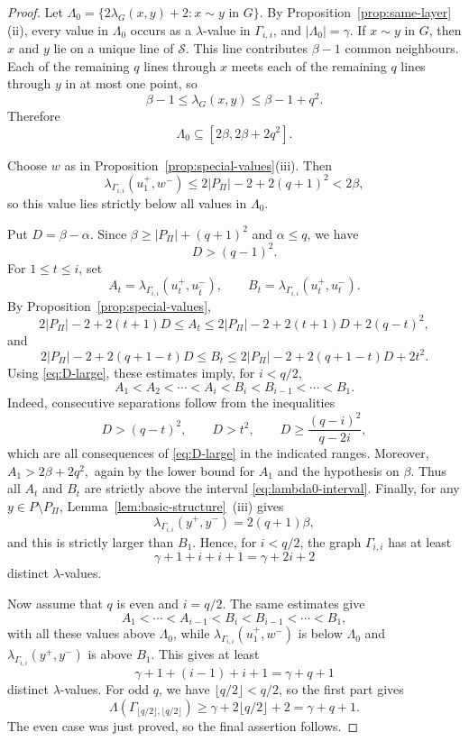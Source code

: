 \documentclass[10pt,a4paper]{amsart}
\begin{document}
\begin{proof}
Let
$\Lambda_0=
\{2\lambda_G(x,y)+2:x\sim y\text{ in }G\}.$
By Proposition~\ref{prop:same-layer}(ii), every value in $\Lambda_0$ occurs as a $\lambda$-value in $\Gamma_{i,i}$, and $|\Lambda_0|=\gamma$.
If $x\sim y$ in $G$, then $x$ and $y$ lie on a unique line of $\mathcal S$.
This line contributes $\beta-1$ common neighbours.
Each of the remaining $q$ lines through $x$ meets each of the remaining $q$ lines through $y$ in at most one point, so
\[
\beta-1\le \lambda_G(x,y)\le \beta-1+q^2.
\]
Therefore
\begin{equation}\label{eq:lambda0-interval}
\Lambda_0\subseteq [2\beta,2\beta+2q^2].
\end{equation}

Choose $w$ as in Proposition~\ref{prop:special-values}(iii).
Then
\[
\lambda_{\Gamma_{i,i}}(u_1^+,w^-)
\le 2|P_\Pi|-2+2(q+1)^2
<2\beta,
\]
so this value lies strictly below all values in $\Lambda_0$.

Put
$D=\beta-\alpha.$
Since $\beta\ge |P_\Pi|+(q+1)^2$ and $\alpha\le q$, we have
\begin{equation}\label{eq:D-large}
D>(q-1)^2.
\end{equation}
For $1\le t\le i$, set
\[
A_t=\lambda_{\Gamma_{i,i}}(u_t^+,u_{\widetilde t}^-),
\qquad
B_t=\lambda_{\Gamma_{i,i}}(u_t^+,u_t^-).
\]
By Proposition~\ref{prop:special-values},
\[
2|P_\Pi|-2+2(t+1)D
\le A_t
\le
2|P_\Pi|-2+2(t+1)D+2(q-t)^2,
\]
and
\[
2|P_\Pi|-2+2(q+1-t)D
\le B_t
\le
2|P_\Pi|-2+2(q+1-t)D+2t^2.
\]
Using \eqref{eq:D-large}, these estimates imply, for $i<q/2$,
\[
A_1<A_2<\cdots<A_i<B_i<B_{i-1}<\cdots<B_1.
\]
Indeed, consecutive separations follow from the inequalities
\[
D>(q-t)^2,
\qquad
D>t^2,
\qquad
D\ge \frac{(q-i)^2}{q-2i},
\]
which are all consequences of \eqref{eq:D-large} in the indicated ranges.
Moreover,
$A_1>2\beta+2q^2,$
again by the lower bound for $A_1$ and the hypothesis on $\beta$.
Thus all $A_t$ and $B_t$ are strictly above the interval \eqref{eq:lambda0-interval}.
Finally, for any $y\in P\setminus P_\Pi$, Lemma~\ref{lem:basic-structure}~(iii) gives
$$\lambda_{\Gamma_{i,i}}(y^+,y^-)=2(q+1)\beta,$$
and this is strictly larger than $B_1$.
Hence, for $i<q/2$, the graph $\Gamma_{i,i}$ has at least
\[
\gamma+1+i+i+1=\gamma+2i+2
\]
distinct $\lambda$-values.

Now assume that $q$ is even and $i=q/2$.
The same estimates give
\[
A_1<\cdots<A_{i-1}<B_i<B_{i-1}<\cdots<B_1,
\]
with all these values above $\Lambda_0$, while $\lambda_{\Gamma_{i,i}}(u_1^+,w^-)$ is below $\Lambda_0$ and $\lambda_{\Gamma_{i,i}}(y^+,y^-)$ is above $B_1$.
This gives at least
\[
\gamma+1+(i-1)+i+1=\gamma+q+1
\]
distinct $\lambda$-values.
For odd \(q\), we have \(\lfloor q/2\rfloor<q/2\), so the first part gives
\[
\Lambda(\Gamma_{\lfloor q/2\rfloor,\lfloor q/2\rfloor})
\ge \gamma+2\lfloor q/2\rfloor+2
=\gamma+q+1.
\]
The even case was just proved, so the final assertion follows.
\end{proof}
\end{document}
